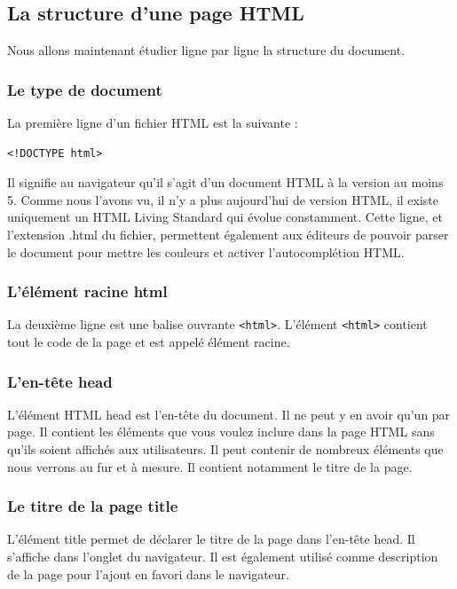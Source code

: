 \documentclass[a4paper]{article}
\begin{document}
\subsection{La structure d'une page {\color{monOrange}HTML}}
Nous allons maintenant étudier ligne par ligne la structure du document.

\subsubsection{Le type de document}
La première ligne d'un fichier{\color{monOrange} HTML} est la suivante :
\begin{verbatim}
<!DOCTYPE html>
\end{verbatim}
Il signifie au navigateur qu'il s'agit d'un document {\color{monOrange}HTML} à la version au moins 5. Comme nous l'avons vu, il n'y a plus aujourd'hui de version {\color{monOrange}HTML}, il existe uniquement un {\color{monOrange}HTML Living Standard} qui évolue constamment. Cette ligne, et l'extension {\color{monOrange}.html} du fichier, permettent également aux éditeurs de pouvoir parser le document pour mettre les couleurs et activer l'autocomplétion {\color{monOrange}HTML}.

\subsubsection{L'élément racine {\color{monOrange}html}}
La deuxième ligne est une balise ouvrante {\tt <html>}. L'élément {\tt <html>} contient tout le code de la page et est appelé élément racine.

\subsubsection{L'en-tête {\color{monOrange}head}}
L'élément {\color{monOrange}HTML head} est l'en-tête du document. Il ne peut y en avoir qu'un par page. Il contient les éléments que vous voulez inclure dans la page {\color{monOrange}HTML} sans qu'ils soient affichés aux utilisateurs. Il peut contenir de nombreux éléments que nous verrons au fur et à mesure. Il contient notamment le titre de la page.

\subsubsection{Le titre de la page {\color{monOrange}title}}
L'élément {\color{monOrange}title} permet de déclarer le titre de la page dans l'en-tête {\color{monOrange}head}. Il s'affiche dans l'onglet du navigateur. Il est également utilisé comme description de la page pour l'ajout en favori dans le navigateur.
\end{document}

